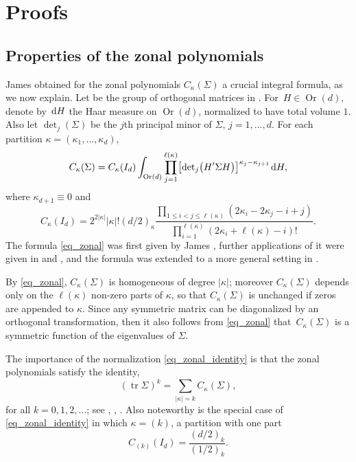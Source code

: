 \documentclass[11pt]{article}
\numberwithin{equation}{section}
\numberwithin{equation}{section}
\def\R {\mathbb{R}}
\def\dd {\hskip1pt\mathrm{d}}
\def\tr {\mathop{\mathrm{tr}}}
\def\Or{\mathop{\mathrm{Or}}}
\begin{document}
\setcounter{section}{4}
\section{Proofs}\label{sec_proofs}

\subsection{Properties of the zonal polynomials}\label{sec_zonal_polys}

James \cite{James73} obtained for the zonal polynomials $C_\kappa(\Sigma)$ a crucial integral formula, as we now explain. Let \smash{$\Or(d) = \bigl\{H \in \R^{d \times d}\mid H'H = I_d\bigr\}$} be the group of orthogonal matrices in \smash{$\R^{d \times d}$}. For~${H \in \Or(d)}$, denote by $\dd H$ the Haar measure on $\Or(d)$, normalized to have total volume $1$. Also let ${\det}_j(\Sigma)$ be the $j$th principal minor of $\Sigma$, $j=1,\ldots,d$. For each partition $\kappa = (\kappa_1,\ldots,\kappa_d)$,
\begin{gather}
\label{eq_zonal}
C_\kappa(\Sigma) = C_\kappa(I_d) \int_{\Or(d)} \prod_{j=1}^{\ell(\kappa)} \bigl[{\det}_j\bigl(H' \Sigma H\bigr)\bigr]^{\kappa_j-\kappa_{j+1}} \dd H,
\end{gather}
where $\kappa_{d+1} \equiv 0$ and
\begin{equation}
\label{eq_zonal_identity}
C_\kappa(I_d) = 2^{2 |\kappa|} |\kappa|! (d/2)_\kappa \frac{\prod\limits_{1 \le i < j \le \ell(\kappa)} (2\kappa_i - 2\kappa_j - i + j)}{\prod\limits_{i=1}^{\ell(\kappa)} (2\kappa_i + \ell(\kappa) - i)!}.
\end{equation}
The formula \eqref{eq_zonal} was first given by James \cite[equation~(10.4)]{James73}, further applications of it were given in \cite{Kushner} and \cite{Richards85}, and the formula was extended to a more general setting in \cite[Theorem~4.8]{GrossRichards}.

By \eqref{eq_zonal}, $C_\kappa(\Sigma)$ is homogeneous of degree $|\kappa|$; moreover $C_\kappa(\Sigma)$ depends only on the $\ell(\kappa)$ non-zero parts of $\kappa$, so that $C_\kappa(\Sigma)$ is unchanged if zeros are appended to $\kappa$. Since any symmetric matrix can be diagonalized by an orthogonal transformation, then it also follows from \eqref{eq_zonal} that~$C_\kappa(\Sigma)$ is a symmetric function of the eigenvalues of $\Sigma$.

The importance of the normalization \eqref{eq_zonal_identity} is that the zonal polynomials satisfy the identity,
\begin{equation}
\label{eq_trace_zonal}
(\tr \Sigma)^k = \sum_{|\kappa|=k} C_\kappa(\Sigma),
\end{equation}
for all $k=0,1,2,\ldots$; see \cite[p.~479, equation~(21)]{James64}, \cite[p.~228, equation~(iii)]{Muirhead}, \cite[equation~(35.4.6)]{Richards10}. Also noteworthy is the special case of \eqref{eq_zonal_identity} in which $\kappa = (k)$, a partition with one part
\begin{equation}
\label{eq_zonal_identity_1part}
C_{(k)}(I_d) = \frac{(d/2)_k}{(1/2)_k}.
\end{equation}
\end{document}
